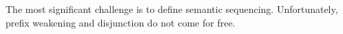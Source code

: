 The most significant challenge is to define semantic sequencing.
Unfortunately, prefix weakening and disjunction do not come for free.



